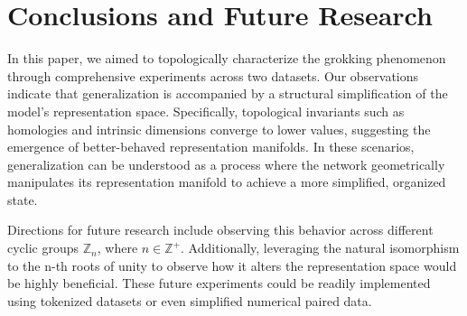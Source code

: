 \section{Conclusions and Future Research}

In this paper, we aimed to topologically characterize the grokking phenomenon through comprehensive experiments across two datasets. Our observations indicate that generalization is accompanied by a structural simplification of the model's representation space. Specifically, topological invariants such as homologies and intrinsic dimensions converge to lower values, suggesting the emergence of better-behaved representation manifolds. In these scenarios, generalization can be understood as a process where the network geometrically manipulates its representation manifold to achieve a more simplified, organized state.

Directions for future research include observing this behavior across different cyclic groups $\mathbb{Z}_n$, where $n \in \mathbb{Z}^+$. Additionally, leveraging the natural isomorphism to the n-th roots of unity to observe how it alters the representation space would be highly beneficial. These future experiments could be readily implemented using tokenized datasets or even simplified numerical paired data.